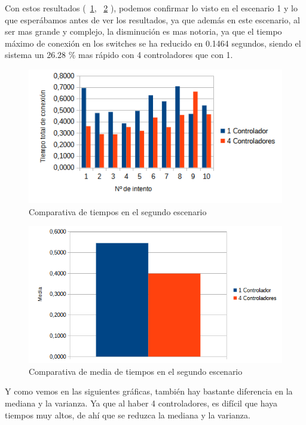 \documentclass[a4paper, 12pt]{book}
\begin{document}
 	Con estos resultados (~\ref{figura:comparativamesh}, ~\ref{figura:mediamesh} ), podemos confirmar lo visto en el escenario 1 y lo que esperábamos antes de ver los resultados, ya que además en este escenario, al ser mas grande y complejo, la disminución es mas notoria, ya que el tiempo máximo de conexión en los switches se ha reducido en 0.1464 segundos, siendo el sistema un 26.28 \% mas rápido con 4 controladores que con 1.
 	
 	\begin{figure}[H]
 		\centering
 		\includegraphics[width=16cm, keepaspectratio]{img/comparativamesh}
 		\caption{Comparativa de tiempos en el segundo escenario}
 		\label{figura:comparativamesh}
 	\end{figure}
 	
 	
 	\begin{figure}[H]
 		\centering
 		\includegraphics[width=12cm, keepaspectratio]{img/comparativamediamesh}
 		\caption{Comparativa de media de tiempos en el segundo escenario}
 		\label{figura:mediamesh}
 	\end{figure}
 	
 	
 	Y como vemos en las siguientes gráficas, también hay bastante diferencia en la mediana y la varianza. Ya que al haber 4 controladores, es difícil que haya tiempos muy altos, de ahí que se reduzca la mediana y la varianza.
 	
\end{document}
